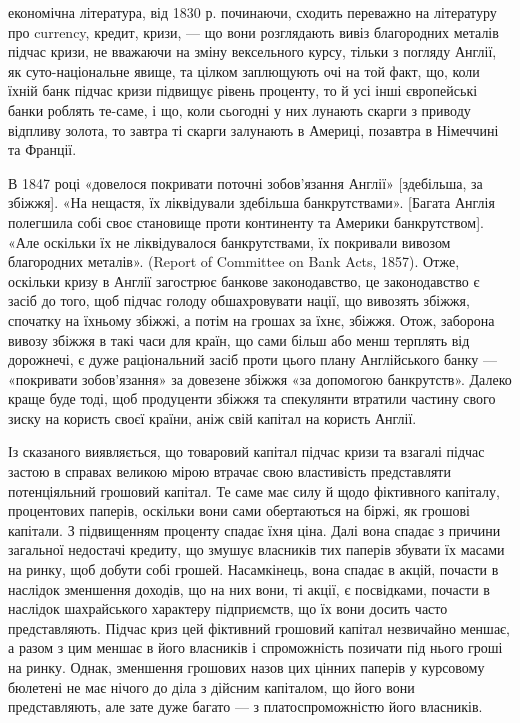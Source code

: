 \parcont{}  %
економічна література, від 1830 р. починаючи, сходить переважно на літературу
про currency, кредит, кризи, — що вони розглядають вивіз благородних металів підчас
кризи, не вважаючи на зміну вексельного курсу, тільки з погляду Англії, як
суто-національне явище, та цілком заплющують очі на той факт, що, коли їхній
банк підчас кризи підвищує рівень проценту, то й усі інші європейські банки
роблять те-саме, і що, коли сьогодні у них лунають скарги з приводу відпливу
золота, то завтра ті скарги залунають в Америці, позавтра в Німеччині та Франції.

В 1847 році «довелося покривати поточні зобов’язання Англії» [здебільша, за
збіжжя]. «На нещастя, їх ліквідували здебільша банкрутствами». [Багата Англія
полегшила собі своє становище проти континенту та Америки банкрутством]. «Але
оскільки їх не ліквідувалося банкрутствами, їх покривали вивозом благородних
металів». (Report of Committee on Bank Acts, 1857). Отже, оскільки кризу в Англії
загострює банкове законодавство, це законодавство є засіб до того, щоб підчас
голоду обшахровувати нації, що вивозять збіжжя, спочатку на їхньому збіжжі,
а потім на грошах за їхнє, збіжжя. Отож, заборона вивозу збіжжя в такі часи
для країн, що сами більш або менш терплять від дорожнечі, є дуже раціональний
засіб проти цього плану Англійського банку — «покривати зобов’язання» за
довезене збіжжя «за допомогою банкрутств». Далеко краще буде тоді, щоб продуценти
збіжжя та спекулянти втратили частину свого зиску на користь своєї
країни, аніж свій капітал на користь Англії.

Із сказаного виявляється, що товаровий капітал підчас кризи та взагалі
підчас застою в справах великою мірою втрачає свою властивість представляти
потенціяльний грошовий капітал. Те саме має силу й щодо фіктивного
капіталу, процентових паперів, оскільки вони сами обертаються на біржі, як
грошові капітали. З підвищенням проценту спадає їхня ціна. Далі вона спадає
з причини загальної недостачі кредиту, що змушує власників тих паперів збувати
їх масами на ринку, щоб добути собі грошей. Насамкінець, вона спадає
в акцій, почасти в наслідок зменшення доходів, що на них вони, ті акції, є
посвідками, почасти в наслідок шахрайського характеру підприємств, що їх вони
досить часто представляють. Підчас криз цей фіктивний грошовий капітал незвичайно
меншає, а разом з цим меншає в його власників і спроможність позичати
під нього гроші на ринку. Однак, зменшення грошових назов цих цінних
паперів у курсовому бюлетені не має нічого до діла з дійсним капіталом, що
його вони представляють, але зате дуже багато — з платоспроможністю його
власників.

